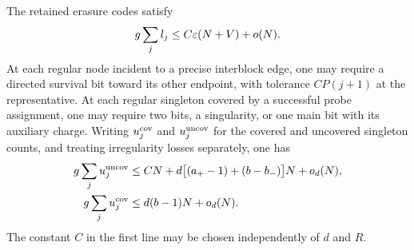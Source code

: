 \begin{lemma}\label{addr:necessary-tests}
The retained erasure codes satisfy
\begin{equation}\label{eq:original-23}
                   g\sum_jl_j\le C\varepsilon(N+V)+o(N).
\end{equation}
At each regular node incident to a precise interblock edge, one may
require a directed survival bit toward its other endpoint, with
tolerance $CP(j+1)$ at the representative.  At each regular
singleton covered by a successful probe assignment, one may require
two bits, a singularity, or one main bit with its auxiliary charge.
Writing $u_j^{\rm cov}$ and $u_j^{\rm uncov}$ for the covered
and uncovered singleton counts, and treating irregularity losses
separately, one has
\begin{equation}\label{eq:original-24}
\begin{split}
 g\sum_ju_j^{\rm uncov}
 &\le CN+d\bigl[(a_+-1)+(b-b_-)\bigr]N+o_d(N),\\
 g\sum_ju_j^{\rm cov}&\le d(b-1)N+o_d(N).
\end{split}
\end{equation}
The constant $C$ in the first line may be chosen independently of
$d$ and $R$.
\end{lemma}

